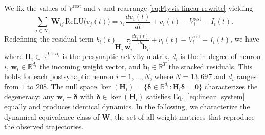 \documentclass{article}
\def\vrest{V^{\mathrm{rest}}}
\begin{document}

We fix the values of $\vrest$ and $\tau$ and rearrange \cref{eq:Flyvis-linear-rewrite} yielding
\begin{equation}
  \sum_{j\in\mathcal{N}_i} \mathbf{W}_{ij}\,\text{ReLU}\!\big(v_j(t)\big)
  = \tau_i \frac{dv_i(t)}{dt} + v_i(t) - V_i^{\text{rest}} - I_i(t).
\end{equation}
Redefining the residual term $b_i(t) = \tau_i \frac{dv_i(t)}{dt} + v_i(t) - V_i^{\text{rest}} - I_i(t)$, we have 
\begin{equation}
  \mathbf{H}_i\,\mathbf{w}_i = \mathbf{b}_i,
  \label{eq:linear_system}
\end{equation}
where $\mathbf{H}_i \in \mathbb{R}^{T \times d_i}$ is the presynaptic
activity matrix, $d_i$ is the in-degree of neuron $i$, $\mathbf{w}_i \in
\mathbb{R}^{d_i}$ the incoming weight vector, and $\mathbf{b}_i \in
\mathbb{R}^T$ the stacked residuals. This holds for each postsynaptic neuron
$i = 1, \ldots, N$, where $N = 13{,}697$ and $d_i$ ranges from $1$ to $208$.
The null space $\ker(\mathbf{H}_i) = \{\boldsymbol{\delta} \in \mathbb{R}^{d_i}
: \mathbf{H}_i\boldsymbol{\delta} = \mathbf{0}\}$ characterizes the
degeneracy: any $\mathbf{w}_i + \boldsymbol{\delta}$ with $\boldsymbol{\delta}
\in \ker(\mathbf{H}_i)$ satisfies Eq.~\eqref{eq:linear_system} equally and
produces identical dynamics. In the following, we characterize the
dynamical equivalence class of $\mathbf{W}$, the set of all weight
matrices that reproduce the observed trajectories.
\end{document}
